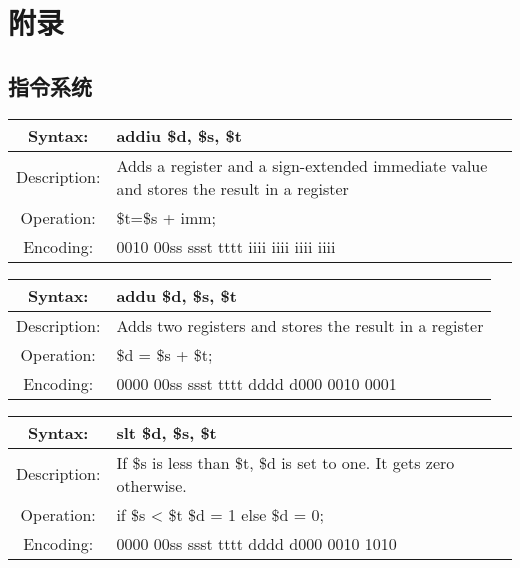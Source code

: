 \section{附录}
    \subsection{指令系统}

    \begin{table}[!hbp]
    \begin{tabularx}{\textwidth}{|c|X|}
        \hline
        Syntax: & addiu \$d, \$s, \$t \\
        \hline
        Description: & Adds a register and a sign-extended immediate value and stores the result in a register \\
        \hline
        Operation: & \$t=\$s + imm; \\
        \hline
        Encoding: & 0010 00ss ssst tttt iiii iiii iiii iiii \\
        \hline
    \end{tabularx}
    \end{table}

    \begin{table}[!hbp]
    \begin{tabularx}{\textwidth}{|c|X|}
        \hline
        Syntax: & addu \$d, \$s, \$t \\
        \hline
        Description: & Adds two registers and stores the result in a register \\
        \hline
        Operation: & \$d = \$s + \$t; \\
        \hline
        Encoding: & 0000 00ss ssst tttt dddd d000 0010 0001 \\
        \hline
    \end{tabularx}
    \end{table}

    
    \begin{table}[!hbp]
    \begin{tabularx}{\textwidth}{|c|X|}
        \hline
        Syntax: & slt \$d, \$s, \$t \\
        \hline
        Description: & If \$s is less than \$t, \$d is set to one. It gets zero otherwise. \\
        \hline
        Operation: & if \$s < \$t \$d = 1 else \$d = 0; \\
        \hline
        Encoding: & 0000 00ss ssst tttt dddd d000 0010 1010 \\
        \hline
    \end{tabularx}
    \end{table}

